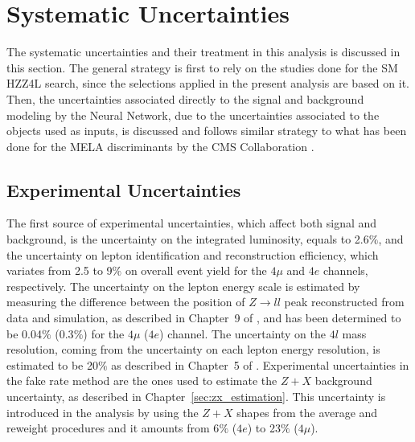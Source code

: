\chapter{Systematic Uncertainties}
\label{sec:systematic_uncertainties}
The systematic uncertainties and their treatment in this analysis is discussed in this section. The general strategy is first to rely on the studies done for the SM HZZ4L search, since the selections applied in the present analysis are based on it. Then, the uncertainties associated directly to the signal and background modeling by the Neural Network, due to the uncertainties associated to the objects used as inputs, is discussed and follows similar strategy to what has been done for the MELA discriminants by the CMS Collaboration \cite{bib:CMS-AN-15-277}.

\section{Experimental Uncertainties}
\label{subsec:experimental_uncertainties}
The first source of experimental uncertainties, which affect both signal and background, is the uncertainty on the integrated luminosity, equals to 2.6$\%$, and the uncertainty on lepton identification and reconstruction efficiency, which variates from 2.5 to 9$\%$ on overall event yield for the $4\mu$ and $4e$ channels, respectively. The uncertainty on the lepton energy scale is estimated by measuring the difference between the position of $Z \rightarrow ll$ peak reconstructed from data and simulation, as described in Chapter~9 of \cite{bib:CMS-AN-16-442}, and has been determined to be 0.04$\%$ (0.3$\%$) for the $4\mu$ ($4e$) channel. The uncertainty on the $4l$ mass resolution, coming from the uncertainty on each lepton energy resolution, is estimated to be 20$\%$ as described in Chapter~5 of \cite{bib:CMS-AN-16-442}. Experimental uncertainties in the fake rate method are the ones used to estimate the $Z+X$ background uncertainty, as described in Chapter~\ref{sec:zx_estimation}. This uncertainty is introduced in the analysis by using the $Z+X$ shapes from the average and reweight procedures and it amounts from 6$\%$ ($4e$) to 23$\%$ ($4\mu$).


